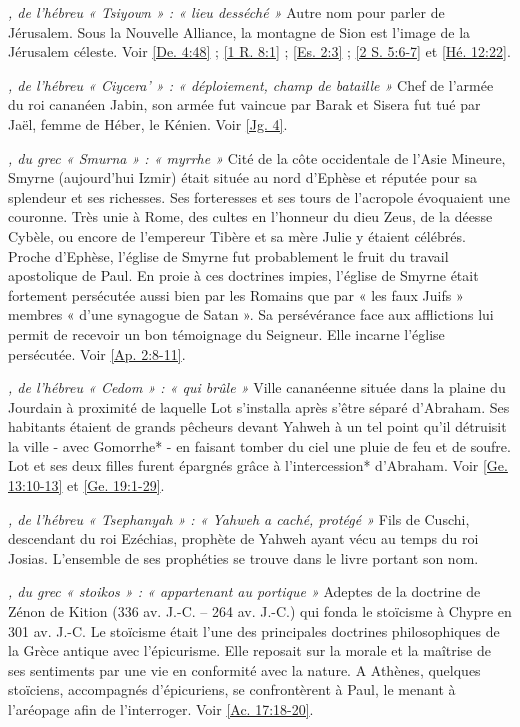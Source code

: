 \begin{multicols}{2}
\textit{, de l'hébreu « Tsiyown » : « lieu desséché »}\newline
Autre nom pour parler de Jérusalem. Sous la Nouvelle Alliance, la montagne de Sion est l'image de la Jérusalem céleste. Voir \vref{De. 4:48} ; \vref{1 R. 8:1} ; \vref{Es. 2:3} ; \vref{2 S. 5:6-7} et \vref{Hé. 12:22}.

\textit{, de l'hébreu « Ciycera' » : « déploiement, champ de bataille »}\newline
Chef de l'armée du roi cananéen Jabin, son armée fut vaincue par Barak et Sisera fut tué par Jaël, femme de Héber, le Kénien. Voir \vref{Jg. 4}.

\textit{, du grec « Smurna » : « myrrhe »}\newline
Cité de la côte occidentale de l'Asie Mineure, Smyrne (aujourd'hui Izmir) était située au nord d'Ephèse et réputée pour sa splendeur et ses richesses. Ses forteresses et ses tours de l'acropole évoquaient une couronne. Très unie à Rome, des cultes en l'honneur du dieu Zeus, de la déesse Cybèle, ou encore de l'empereur Tibère et sa mère Julie y étaient célébrés. Proche d'Ephèse, l'église de Smyrne fut probablement le fruit du travail apostolique de Paul. En proie à ces doctrines impies, l'église de Smyrne était fortement persécutée aussi bien par les Romains que par « les faux Juifs » membres « d'une synagogue de Satan ». Sa persévérance face aux afflictions lui permit de recevoir un bon témoignage du Seigneur. Elle incarne l'église persécutée. Voir \vref{Ap. 2:8-11}.

\textit{, de l'hébreu « Cedom » : « qui brûle »}\newline
Ville cananéenne située dans la plaine du Jourdain à proximité de laquelle Lot s'installa après s'être séparé d'Abraham. Ses habitants étaient de grands pêcheurs devant Yahweh à un tel point qu'il détruisit la ville - avec Gomorrhe* - en faisant tomber du ciel une pluie de feu et de soufre. Lot et ses deux filles furent épargnés grâce à l'intercession* d'Abraham. Voir \vref{Ge. 13:10-13} et \vref{Ge. 19:1-29}.

\textit{, de l'hébreu « Tsephanyah » : « Yahweh a caché, protégé »}\newline
Fils de Cuschi, descendant du roi Ezéchias, prophète de Yahweh ayant vécu au temps du roi Josias. L'ensemble de ses prophéties se trouve dans le livre portant son nom.

\textit{, du grec « stoikos » : « appartenant au portique »}\newline
Adeptes de la doctrine de Zénon de Kition (336 av. J.-C. – 264 av. J.-C.) qui fonda le stoïcisme à Chypre en 301 av. J.-C. Le stoïcisme était l'une des principales doctrines philosophiques de la Grèce antique avec l'épicurisme. Elle reposait sur la morale et la maîtrise de ses sentiments par une vie en conformité avec la nature. A Athènes, quelques stoïciens, accompagnés d'épicuriens, se confrontèrent à Paul, le menant à l'aréopage afin de l'interroger. Voir \vref{Ac. 17:18-20}.


\end{multicols}
